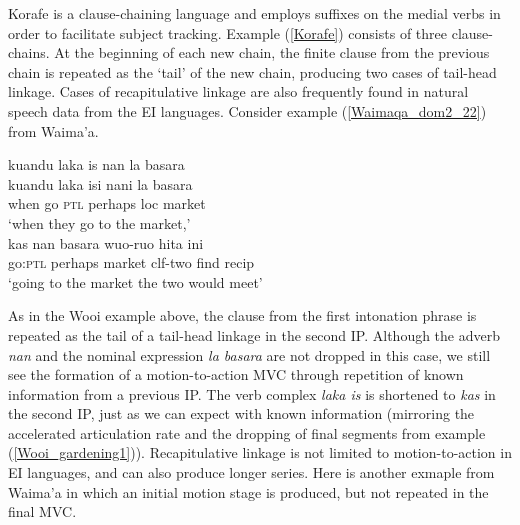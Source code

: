 Korafe is a clause-chaining language and employs suffixes on the medial verbs in order to facilitate subject tracking. Example (\ref{Korafe}) consists of three clause-chains. At the beginning of each new chain, the finite clause from the previous chain is repeated as the `tail' of the new chain, producing two cases of tail-head linkage. Cases of recapitulative linkage are also frequently found in natural speech data from the EI languages. Consider example (\ref{Waimaqa_dom2_22}) from Waima'a.

\pex \label{Waimaqa_dom2_22}
\a
\gll kuandu laka is nan la basara \\
kuandu laka isi nani la basara \\
\glc when go \textsc{ptl} perhaps \acs{loc} market \\
\glft `when they go to the market,' \\ 
\z
\a
\gll kas nan basara wuo-ruo hita ini \\ 
go:\textsc{ptl} perhaps market \acs{clf}-two find \acs{recip} \\
\glft `going to the market the two would meet' \\ 
\z
\xe

As in the Wooi example above, the clause from the first intonation phrase is repeated as the tail of a tail-head linkage in the second IP. Although the adverb \textit{nan} and the nominal expression \textit{la basara} are not dropped in this case, we still see the formation of a motion-to-action MVC through repetition of known information from a previous IP. The verb complex \textit{laka is} is shortened to \textit{kas} in the second IP, just as we can expect with known information (mirroring the accelerated articulation rate and the dropping of final segments from example (\ref{Wooi_gardening1})). Recapitulative linkage is not limited to motion-to-action in EI languages, and can also produce longer series. Here is another exmaple from Waima'a in which an initial motion stage is produced, but not repeated in the final MVC. 

